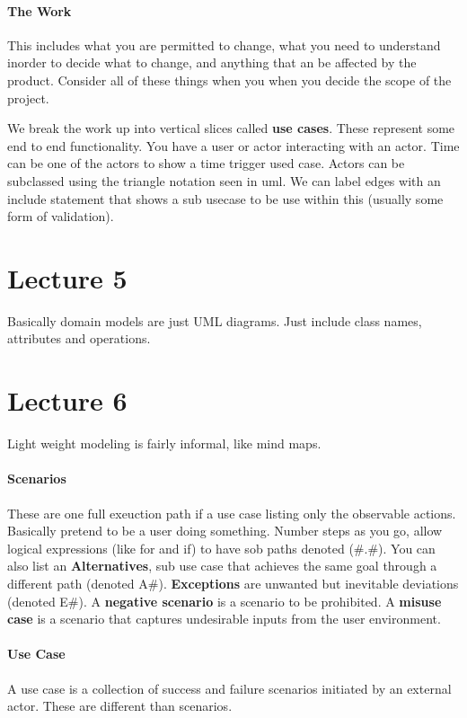 \documentclass[12pt]{article}
\begin{document}
\paragraph{The Work} 
\label{par:the_work}
This includes what you are permitted to change, what you need to understand inorder to decide what to change, and anything that an be affected by the product. Consider all of these things when you when you decide the scope of the project.

We break the work up into vertical slices called \textbf{use cases}. These represent some end to end functionality. You have a user or actor interacting with an actor. Time can be one of the actors to show a time trigger used case. Actors can be subclassed using the triangle notation seen in uml. We can label edges with an include statement that shows a sub usecase to be use within this (usually some form of validation).  


\section*{Lecture 5}
\label{sec:lecture_5}
Basically domain models are just UML diagrams. Just include class names, attributes and operations.

\section*{Lecture 6}
\label{sec:lecture_6}
Light weight modeling is fairly informal, like mind maps.

\paragraph{Scenarios}
\label{par:scenarios}
These are one full exeuction path if a use case listing only the observable actions. Basically pretend to be a user doing something. Number steps as you go, allow logical expressions (like for and if) to have sob paths denoted (#.#). You can also list an \textbf{Alternatives}, sub use case that achieves the same goal through a different path (denoted A#). \textbf{Exceptions} are unwanted but inevitable deviations (denoted E#). A \textbf{negative scenario} is a scenario to be prohibited. A \textbf{misuse case} is a scenario that captures undesirable inputs from the user environment.

\paragraph{Use Case} 
\label{par:use_case}
A use case is a collection of success and failure scenarios initiated by an external actor. These are different than scenarios. 
\end{document}
